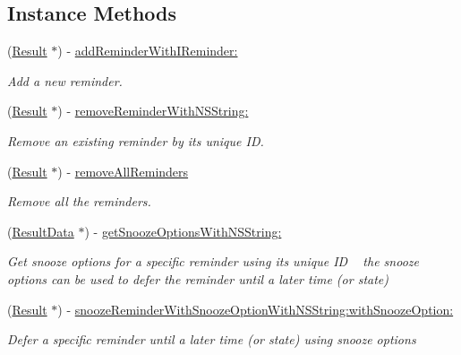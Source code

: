 \subsection*{Instance Methods}
\begin{DoxyCompactItemize}
\item 
(\hyperlink{interface_result}{Result} $\ast$) -\/ \hyperlink{protocol_i_reminders_manager-p_ac248b7f8a27a75c278840a0730353a64}{add\+Reminder\+With\+I\+Reminder\+:}
\begin{DoxyCompactList}\small\item\em Add a new reminder. \end{DoxyCompactList}\item 
(\hyperlink{interface_result}{Result} $\ast$) -\/ \hyperlink{protocol_i_reminders_manager-p_a1cf57074681eb8b70b7117441cf50c3b}{remove\+Reminder\+With\+N\+S\+String\+:}
\begin{DoxyCompactList}\small\item\em Remove an existing reminder by its unique I\+D. \end{DoxyCompactList}\item 
(\hyperlink{interface_result}{Result} $\ast$) -\/ \hyperlink{protocol_i_reminders_manager-p_a8bd817f76f58b3d31f914ce1c093e37a}{remove\+All\+Reminders}
\begin{DoxyCompactList}\small\item\em Remove all the reminders. \end{DoxyCompactList}\item 
(\hyperlink{interface_result_data}{Result\+Data} $\ast$) -\/ \hyperlink{protocol_i_reminders_manager-p_ab7915fbe5bb427f2898e8a4626b53419}{get\+Snooze\+Options\+With\+N\+S\+String\+:}
\begin{DoxyCompactList}\small\item\em Get snooze options for a specific reminder using its unique I\+D ~\newline
 the snooze options can be used to defer the reminder until a later time (or state) \end{DoxyCompactList}\item 
(\hyperlink{interface_result}{Result} $\ast$) -\/ \hyperlink{protocol_i_reminders_manager-p_aff027d41ac4a793a2a72f326dfece125}{snooze\+Reminder\+With\+Snooze\+Option\+With\+N\+S\+String\+:with\+Snooze\+Option\+:}
\begin{DoxyCompactList}\small\item\em Defer a specific reminder until a later time (or state) using snooze options ~\newline

\end{DoxyCompactList}
\end{DoxyCompactItemize}
